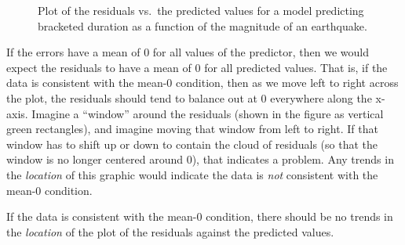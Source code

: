 \documentclass[
  letterpaper,
  DIV=11,
  numbers=noendperiod]{scrreprt}
\theoremstyle{definition}
\theoremstyle{definition}
\theoremstyle{plain}
\theoremstyle{remark}
\begin{document}
\begin{figure}


\caption{\label{fig-regassessment-mean0}Plot of the residuals vs.~the
predicted values for a model predicting bracketed duration as a function
of the magnitude of an earthquake.}

\end{figure}%

If the errors have a mean of 0 for all values of the predictor, then we
would expect the residuals to have a mean of 0 for all predicted values.
That is, if the data is consistent with the mean-0 condition, then as we
move left to right across the plot, the residuals should tend to balance
out at 0 everywhere along the x-axis. Imagine a ``window'' around the
residuals (shown in the figure as vertical green rectangles), and
imagine moving that window from left to right. If that window has to
shift up or down to contain the cloud of residuals (so that the window
is no longer centered around 0), that indicates a problem. Any trends in
the \emph{location} of this graphic would indicate the data is
\emph{not} consistent with the mean-0 condition.

\begin{tcolorbox}[enhanced jigsaw, colbacktitle=quarto-callout-note-color!10!white, colback=white, left=2mm, title=\textcolor{quarto-callout-note-color}{\faInfo}\hspace{0.5em}{Graphically Assessing the Mean-0 Condition}, toptitle=1mm, leftrule=.75mm, breakable, bottomrule=.15mm, arc=.35mm, rightrule=.15mm, toprule=.15mm, coltitle=black, opacityback=0, colframe=quarto-callout-note-color-frame, opacitybacktitle=0.6, bottomtitle=1mm, titlerule=0mm]

If the data is consistent with the mean-0 condition, there should be no
trends in the \emph{location} of the plot of the residuals against the
predicted values.

\end{tcolorbox}
\end{document}
